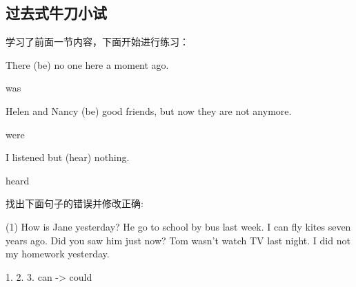 \documentclass[a4paper]{article}
\begin{document}
  \subsection{过去式牛刀小试}
学习了前面一节内容，下面开始进行练习：

\begin{question}
 There \blank[width=1.5cm]{}(be) no one here a moment ago.
\end{question}
\begin{solution}
 was
\end{solution}

\begin{question}
 Helen and Nancy \blank[width=1.5cm]{}(be) good friends, but now they are not anymore.
\end{question}
\begin{solution}
 were
\end{solution}

\begin{question}
 I listened but \blank[width=1.5cm]{}(hear) nothing.
\end{question}
\begin{solution}
 heard
\end{solution}

\begin{question}
\noindent 找出下面句子的错误并修改正确:

  \begin{tasks}[style=enumerate, label-offset=1em, label-align=right](1)
    \task How is Jane yesterday? \qquad \quad \blank[width=2cm]{}
    \task He go to school by bus last week. \quad \blank[width=2cm]{}
    \task I can fly kites seven years ago. \quad \blank[width=2cm]{}
    \task Did you saw him just now? \quad \blank[width=2cm]{}
    \task Tom wasn't watch TV last night. \quad \blank[width=2cm]{}
    \task I did not my homework yesterday. \quad \blank[width=2cm]{}
  \end{tasks}
\end{question}
\begin{solution}
 1.
 2.
 3. can -> could
\end{solution}
\end{document}

